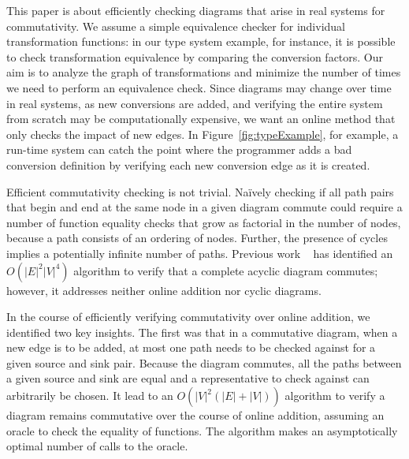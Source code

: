 \documentclass[sigplan,review,anonymous]{acmart}
\begin{document}
This paper is about efficiently checking diagrams that arise in real systems for commutativity.
We assume a simple equivalence checker for individual transformation functions: in our type system example, for instance, it is possible to check transformation equivalence by comparing the conversion factors.
Our aim is to analyze the graph of transformations and minimize the number of times we need to perform an equivalence check.
Since diagrams may change over time in real systems, as new conversions are added, and verifying the entire system from scratch may be computationally expensive, we want an online method that only checks the impact of new edges.
In Figure~\ref{fig:typeExample}, for example, a run-time system can catch the point where the programmer adds a bad conversion definition by verifying each new conversion edge as it is created.

Efficient commutativity checking is not trivial.
Na\"{i}vely checking if all path pairs that begin and end at the same node in a given diagram commute could require a number of function equality checks that grow as factorial in the number of nodes, because a path consists of an ordering of nodes.
Further, the presence of cycles implies a potentially infinite number of paths.
Previous work ~\cite{commutative} has identified an $O(|E|^2|V|^4)$ algorithm to verify that a complete acyclic diagram commutes; however, it addresses neither online addition nor cyclic diagrams.

In the course of efficiently verifying commutativity over online addition, we identified two key insights.
The first was that in a commutative diagram, when a new edge is to be added, at most one path needs to be checked against  for a given source and sink pair.
Because the diagram commutes, all the paths between a given source and sink are equal and a representative to check against can arbitrarily be chosen.
It lead to an $O(|V|^2(|E|+|V|))$ algorithm to verify a diagram remains commutative over the course of online addition, assuming an oracle to check the equality of functions.
The algorithm makes an asymptotically optimal number of calls to the oracle.
\end{document}
